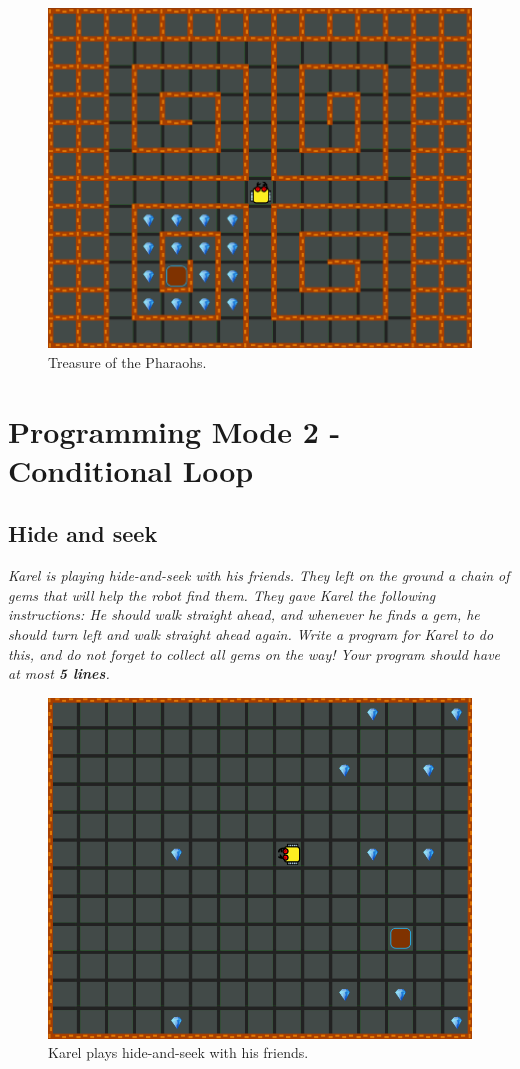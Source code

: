 \vspace{-5mm}
\begin{figure}[!ht]
\begin{center}
\includegraphics[height=0.4\textwidth]{img/d04.png}
\end{center}
\vspace{-4mm}
\caption{Treasure of the Pharaohs.}
\label{fig:d04}
\vspace{-10mm}
\end{figure}


\section{Programming Mode 2 - Conditional Loop}

\subsection{Hide and seek}

{\em Karel is playing hide-and-seek with his friends. They left on the ground a chain of gems that will help the robot find them. They gave Karel the following instructions: He should walk straight ahead, and whenever he finds a gem, he should turn left and walk straight ahead again. Write a program for Karel to do this, and do not forget to collect all gems on the way! Your program should have at most {\bf 5 lines}.}\\[-7mm]

\begin{figure}[!ht]
\begin{center}
\includegraphics[height=0.4\textwidth]{img/e01.png}
\end{center}
\vspace{-4mm}
\caption{Karel plays hide-and-seek with his friends.}
\label{fig:e02}
\end{figure}
\vspace{-10mm}
\newpage

